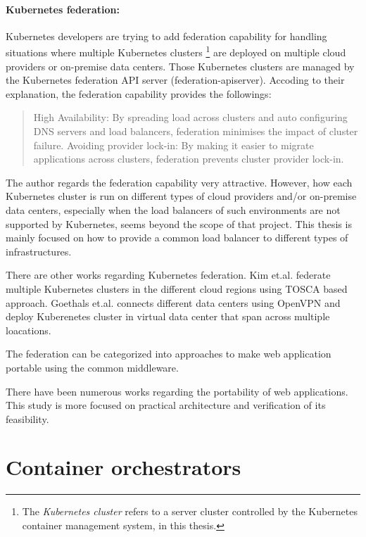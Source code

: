 \paragraph{\bf Kubernetes federation:}

Kubernetes developers are trying to add federation \cite{K8sFederation2017} capability for handling situations 
where multiple Kubernetes clusters \footnote{The {\em Kubernetes cluster} refers to a server cluster 
controlled by the Kubernetes container management system, in this thesis.} 
are deployed on multiple cloud providers or on-premise data centers. 
Those Kubernetes clusters are managed by the Kubernetes federation API server (federation-apiserver).
Accoding to their explanation\cite{K8sFederation2017}, the federation capability provides the followings: 
\begin{quote}
High Availability: By spreading load across clusters and auto configuring DNS servers and load balancers, federation minimises the impact of cluster failure.
Avoiding provider lock-in: By making it easier to migrate applications across clusters, federation prevents cluster provider lock-in.
\end{quote}

The author regards the federation capability very attractive.
However, how each Kubernetes cluster is run on different types of cloud providers
and/or on-premise data centers, especially when the load balancers of such environments are not supported by Kubernetes, 
seems beyond the scope of that project.
This thesis is mainly focused on how to provide a common load balancer to different types of infrastructures.

There are other works \cite{kim2019tosca,goethals2019fuse} regarding Kubernetes federation. 
Kim et.al. \cite{kim2019tosca} federate multiple Kubernetes clusters in the different cloud regions using TOSCA based approach.
Goethals et.al.\cite{goethals2019fuse} connects different data centers using OpenVPN \cite{} and deploy Kuberenetes cluster in virtual data center that span across multiple loacations.

The federation can be categorized into approaches to make web application portable using the common middleware.

There have been numerous works regarding the portability of web applications.
This study is more focused on practical architecture and verification of its feasibility.

\section{Container orchestrators}

